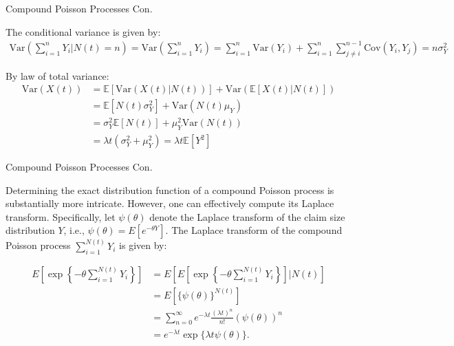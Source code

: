 \documentclass{beamer}
\begin{document}
\begin{frame}{Compound Poisson Processes Con.}

    {\footnotesize \footnotesize
    \par  The conditional variance is given by:
    \vspace{1em }
    \begin{align*}
        \text{Var}(\sum_{i=1}^n Y_i | N(t) = n) = \text{Var}\left(\sum_{i=1}^n Y_i\right) 
        =\sum_{i=1}^n \text{Var}(Y_i) +  \sum_{i=1}^n \sum_{j \neq i}^{n-1} \text{Cov}(Y_i, Y_j)= n\sigma^2_Y
    \end{align*}
    \par \pause By law of total variance:
    \vspace{1em }
    \begin{align*}
        \text{Var}(X(t)) &= \mathbb{E}[\text{Var}(X(t) | N(t))] + \text{Var}(\mathbb{E}[X(t) | N(t)])\\
        &= \mathbb{E}[N(t)\sigma_Y^2] + \text{Var}(N(t)\mu_Y) \\
        &= \sigma_Y^2 \mathbb{E}[N(t)] + \mu_Y^2 \text{Var}(N(t))\\
        & =  \lambda t (\sigma_Y^2 + \mu_Y^2) = \lambda t \mathbb{E}[Y^2]
    \end{align*}


    }
    
\end{frame}

\begin{frame}{Compound Poisson Processes Con.}

    {\footnotesize \footnotesize
    \par Determining the exact distribution function of a compound Poisson process
    is substantially more intricate.  \pause However, one can effectively compute its Laplace
    transform. Specifically, let \(\psi(\theta)\) denote the Laplace transform of the claim size distribution \(Y\), i.e., \(\psi(\theta) = E[e^{-\theta Y}]\). 
    The Laplace transform of the compound Poisson process \(\sum_{i=1}^{N(t)} Y_i\) is given by: \pause 

    \vspace{1em}
    \begin{align*}
        E \left[ \exp\left\{ -\theta \sum_{i=1}^{N(t)} Y_i \right\} \right] 
        &= E \left[ E \left[ \exp\left\{ -\theta \sum_{i=1}^{N(t)} Y_i \right\} \right] \bigg| N(t) \right] \\
        &= E \left[ \{\psi(\theta)\}^{N(t)} \right] \\
        &= \sum_{n=0}^{\infty} e^{-\lambda t} \frac{(\lambda t)^n}{n!} (\psi(\theta))^n \\
        &= e^{-\lambda t} \exp \{\lambda t \psi(\theta)\}.
    \end{align*}
    
    }
    
\end{frame}
\end{document}
